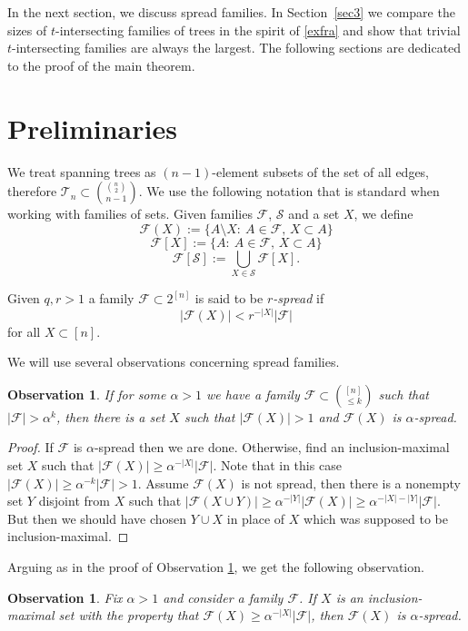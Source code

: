 \documentclass[11pt,letterpaper]{amsart}
\renewcommand{\le}{\leqslant}
\renewcommand{\ge}{\geqslant}
\newcommand{\ff}{\mathcal{F}}
\newcommand{\s}{\mathcal{S}}
\newcommand{\T}{\mathcal{T}}
\newtheorem{observation}[theorem]{Observation}
\begin{document}
In the next section, we discuss spread families. In Section~\ref{sec3} we compare the sizes of $t$-intersecting families of trees in the spirit of \eqref{exfra} and show that trivial $t$-intersecting families are always the largest. The following sections are dedicated to the proof of the main theorem.
\section{Preliminaries}
We treat spanning trees as $(n-1)$-element subsets of the set of all edges, therefore $\T_n \subset {{n\choose 2}\choose n-1}$. We use the following notation that is standard when working with families of sets. Given families $\ff$, $\s$ and a set $X$, we define
$$\ff(X) :=\{ A\setminus X  :\    A \in \ff, \,  X \subset A \}$$
$$\ff[X] :=\{ A  : \ A\in \ff, \,  X \subset A \}$$
$$\ff[ \s ] := \bigcup\limits_{X \in \s }\ff[X].$$

Given $q, r >1$ a family $\ff\subset2^{[n]}$ is said to be \textit{$r$-spread} if $$|\ff(X)| < r^{-|X|}|\mathcal{F}|$$ for all $X \subset [n]$.

We will use several observations concerning spread families.

\begin{observation}\label{obs_spread_1}
  If for some $\alpha>1$ we have a family $\ff\subset {[n]\choose \le k}$ such that $|\ff| > \alpha^k$, then there is a set $X$ such that $|\ff(X)|>1$  and $\ff(X)$ is $\alpha$-spread.
\end{observation}

\begin{proof}
    If $\ff$ is $\alpha$-spread then we are done. Otherwise, find an inclusion-maximal set $X$ such that $|\ff(X)| \ge \alpha^{-|X|}|\ff|.$ Note that in this case $|\ff(X)| \ge \alpha^{-k}|\ff| > 1$. Assume $\ff(X)$ is not spread, then there is a nonempty set $Y$ disjoint from $X$ such that $|\ff(X \cup Y)| \ge \alpha^{-|Y|}|\ff(X)| \ge \alpha^{-|X|-|Y|}|\ff|$. But then we should have chosen $Y \cup X$ in place of $X$ which was supposed to be inclusion-maximal.
\end{proof}
 Arguing as in the proof of Observation \ref{obs_spread_1}, we get the following observation.
\begin{observation}\label{obs_spread_2}
  Fix $\alpha>1$ and consider a family $\ff$. If $X$ is an inclusion-maximal set with the property that $\ff(X) \ge \alpha^{-|X|}|\ff|$, then $\ff(X)$ is $\alpha$-spread.
\end{observation}
\end{document}
